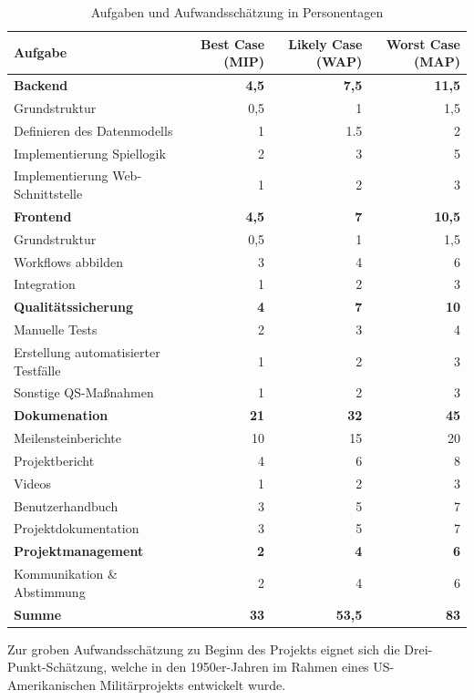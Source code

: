 \documentclass[a4paper,11pt,listof=numbered,glossary=totoc,parskip=half,toc=bib]{scrreprt}
\begin{document}
	\begin{table}
		\centering
		\begin{tabular}{lrrr}
			\toprule
			Aufgabe & Best Case (MIP) & Likely Case (WAP) & Worst Case (MAP) \\
			\midrule
			\textbf{Backend} & \textbf{4,5} & \textbf{7,5} & \textbf{11,5} \\
			Grundstruktur & 0,5 & 1 & 1,5 \\
			Definieren des Datenmodells & 1 & 1.5 & 2 \\
			Implementierung Spiellogik & 2 & 3 & 5 \\
			Implementierung Web-Schnittstelle & 1 & 2 & 3 \\
			\midrule
			\textbf{Frontend} & \textbf{4,5} & \textbf{7} & \textbf{10,5} \\
			Grundstruktur & 0,5 & 1 & 1,5 \\
			Workflows abbilden & 3 & 4 & 6 \\
			Integration & 1 & 2 & 3 \\
			\midrule
			\textbf{Qualitätssicherung} & \textbf{4} & \textbf{7} & \textbf{10} \\
			Manuelle Tests & 2 & 3 & 4 \\
			Erstellung automatisierter Testfälle & 1 & 2 & 3 \\
			Sonstige QS-Maßnahmen & 1 & 2 & 3 \\
			\midrule 
			\textbf{Dokumenation} & \textbf{21} & \textbf{32} & \textbf{45} \\
			Meilensteinberichte & 10 & 15 & 20 \\
			Projektbericht & 4 & 6 & 8 \\
			Videos & 1 & 2 & 3 \\
			Benutzerhandbuch & 3 & 5 & 7 \\
			Projektdokumentation & 3 & 5 & 7 \\
			\midrule
			\textbf{Projektmanagement} & \textbf{2} & \textbf{4} & \textbf{6} \\
			Kommunikation \& Abstimmung & 2 & 4 & 6 \\
			\midrule 
			\Large\bfseries Summe & \Large\bfseries 33 & \Large\bfseries 53,5 & \Large\bfseries 83 \\
			\bottomrule	
				
		\end{tabular}
		\caption{Aufgaben und Aufwandsschätzung in Personentagen}
		\label{tab:aufwand}
	\end{table}
	
	Zur groben Aufwandsschätzung zu Beginn des Projekts eignet sich die Drei-Punkt-Schätzung, welche in den 1950er-Jahren im Rahmen eines US-Amerikanischen Militärprojekts entwickelt
wurde. 
\end{document}
